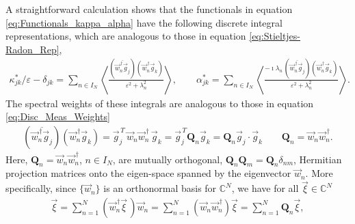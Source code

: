 \documentclass[11pt]{amsart}
\renewcommand{\d}{\mathrm{d}}
\newcommand{\Qb}{\mathbf{Q}}
\begin{document}
A straightforward calculation shows that the functionals in equation
\eqref{eq:Functionals_kappa_alpha} have the following discrete integral
representations, which are analogous to those in equation
\eqref{eq:Stieltjes-Radon_Rep},   
%
\begin{align}\label{eq:Integral_Rep_Discrete}
\kappa^*_{jk}/\varepsilon-\delta_{jk}  
%                   
=\sum_{n\in I_N} 
  \left\langle
    \frac{(\overline{\vec{w}_n^{\,\dagger}\vec{g}_j})(\vec{w}_n^{\,\dagger}\vec{g}_k)}{\varepsilon^2+\lambda_n^2}
  \right\rangle,
%                   
 \qquad
\alpha^*_{jk}
=\sum_{n\in I_N} 
 \left\langle\frac{-\imath\lambda_n\,(\overline{\vec{w}_n^{\,\dagger}\vec{g}_j})(\vec{w}_n^{\,\dagger}\vec{g}_k)}{\varepsilon^2+\lambda_n^2}\right\rangle.
%                   
\end{align}
%
The spectral weights of these integrals are analogous to those in
equation \eqref{eq:Disc_Meas_Weights}   
%
\begin{align}\label{eq:Disc_Meas_Weights_Matrix}
  (\overline{\vec{w}_n^{\,\dagger}\vec{g}_j})(\vec{w}_n^{\,\dagger}\vec{g}_k)
  =\vec{g}_j^{\,T}\,\vec{w}_n\vec{w}_n^{\,\dagger}\,\vec{g}_k
  =\vec{g}_j^{\,T}\Qb_n\vec{g}_k
  =\Qb_n\vec{g}_j\cdot\vec{g}_k
  \qquad
  \Qb_n=\vec{w}_n\vec{w}_n^{\,\dagger}.  
\end{align}
%
Here, $\Qb_n=\vec{w}_n\vec{w}_n^{\,\dagger}$, $n\in I_N$, are mutually
orthogonal, $\Qb_n\Qb_m=\Qb_n\delta_{nm}$, Hermitian projection matrices
onto the eigen-space spanned by the eigenvector $\vec{w}_n$. More
specifically, since $\{\vec{w}_n\}$ is an orthonormal basis for   
$\mathbb{C}^N$, we have for all $\vec{\xi}\in\mathbb{C}^N$
%
\begin{align}\label{eq:Res_of_I}
  \vec{\xi}=\sum_{n=1}^N(\vec{w}_n^{\,\dagger}\vec{\xi}\,)\vec{w}_n
         =\sum_{n=1}^N(\vec{w}_n\vec{w}_n^{\,\dagger})\vec{\xi}
         =\sum_{n=1}^N\Qb_n\vec{\xi},         
\end{align}
\end{document}
